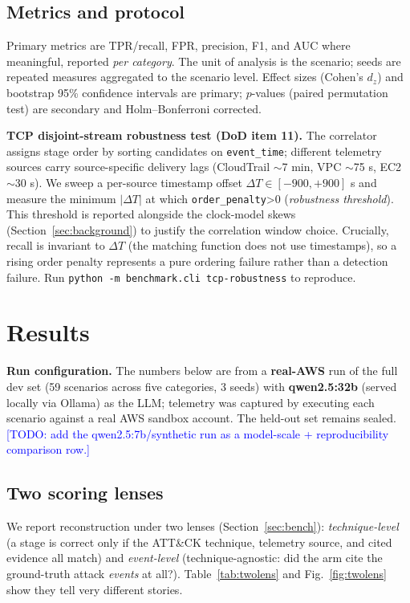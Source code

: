 \documentclass[journal]{IEEEtran}
\newcommand{\todo}[1]{\textcolor{blue}{[TODO: #1]}}
\begin{document}
\subsection{Metrics and protocol}
Primary metrics are TPR/recall, FPR, precision, F1, and AUC where meaningful, reported
\emph{per category}. The unit of analysis is the scenario; seeds are repeated measures
aggregated to the scenario level. Effect sizes (Cohen's $d_z$) and bootstrap 95\%
confidence intervals are primary; $p$-values (paired permutation test) are secondary and
Holm--Bonferroni corrected.

\textbf{TCP disjoint-stream robustness test (DoD item 11).}
The correlator assigns stage order by sorting candidates on \texttt{event\_time};
different telemetry sources carry source-specific delivery lags (CloudTrail $\sim$7 min,
VPC $\sim$75 s, EC2 $\sim$30 s). We sweep a per-source timestamp offset $\Delta T \in
[-900, +900]$ s and measure the minimum $|\Delta T|$ at which \texttt{order\_penalty}>0
(\emph{robustness threshold}). This threshold is reported alongside the clock-model skews
(Section~\ref{sec:background}) to justify the correlation window choice. Crucially,
recall is invariant to $\Delta T$ (the matching function does not use timestamps), so a
rising order penalty represents a pure ordering failure rather than a detection failure.
Run \texttt{python -m benchmark.cli tcp-robustness} to reproduce.

\section{Results}\label{sec:results}
\noindent\textbf{Run configuration.} The numbers below are from a \textbf{real-AWS} run of the full dev set
(59 scenarios across five categories, 3 seeds) with \textbf{qwen2.5:32b} (served locally via Ollama) as the LLM;
telemetry was captured by executing each scenario against a real AWS sandbox account. The held-out set remains
sealed. \todo{add the qwen2.5:7b/synthetic run as a model-scale + reproducibility comparison row.}

\subsection{Two scoring lenses}
We report reconstruction under two lenses (Section~\ref{sec:bench}): \emph{technique-level} (a stage is
correct only if the ATT\&CK technique, telemetry source, and cited evidence all match) and \emph{event-level}
(technique-agnostic: did the arm cite the ground-truth attack \emph{events} at all?). Table~\ref{tab:twolens}
and Fig.~\ref{fig:twolens} show they tell very different stories.
\end{document}

